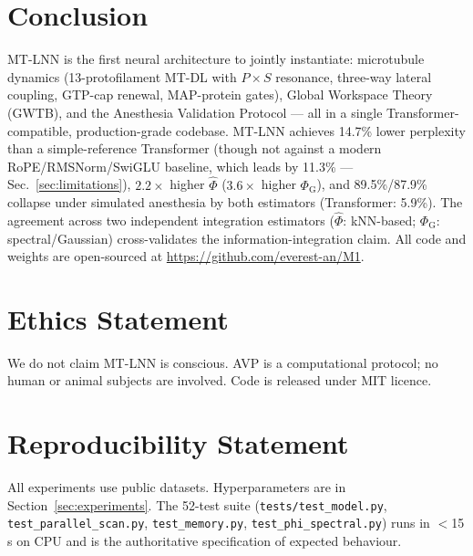 \documentclass[11pt]{article}
\theoremstyle{definition}
\newcommand{\phihat}{\hat{\Phi}}
\newcommand{\phig}{\Phi_{\mathrm{G}}}
\begin{document}
\section{Conclusion}
\label{sec:conclusion}

MT-LNN is the first neural architecture to jointly instantiate: microtubule dynamics (13-protofilament MT-DL with $P\!\times\!S$ resonance, three-way lateral coupling, GTP-cap renewal, MAP-protein gates), Global Workspace Theory (GWTB), and the Anesthesia Validation Protocol — all in a single Transformer-compatible, production-grade codebase. MT-LNN achieves 14.7\% lower perplexity than a simple-reference Transformer (though not against a modern RoPE/RMSNorm/SwiGLU baseline, which leads by 11.3\% --- Sec.~\ref{sec:limitations}), $2.2\times$ higher $\phihat$ ($3.6\times$ higher $\phig$), and 89.5\%/87.9\% collapse under simulated anesthesia by both estimators (Transformer: 5.9\%). The agreement across two independent integration estimators ($\phihat$: kNN-based; $\phig$: spectral/Gaussian) cross-validates the information-integration claim. All code and weights are open-sourced at \url{https://github.com/everest-an/M1}.

\section*{Ethics Statement}
We do not claim MT-LNN is conscious. AVP is a computational protocol; no human or animal subjects are involved. Code is released under MIT licence.

\section*{Reproducibility Statement}
All experiments use public datasets. Hyperparameters are in Section~\ref{sec:experiments}. The 52-test suite (\texttt{tests/test\_model.py}, \texttt{test\_parallel\_scan.py}, \texttt{test\_memory.py}, \texttt{test\_phi\_spectral.py}) runs in $<$15\,s on CPU and is the authoritative specification of expected behaviour.
\end{document}
